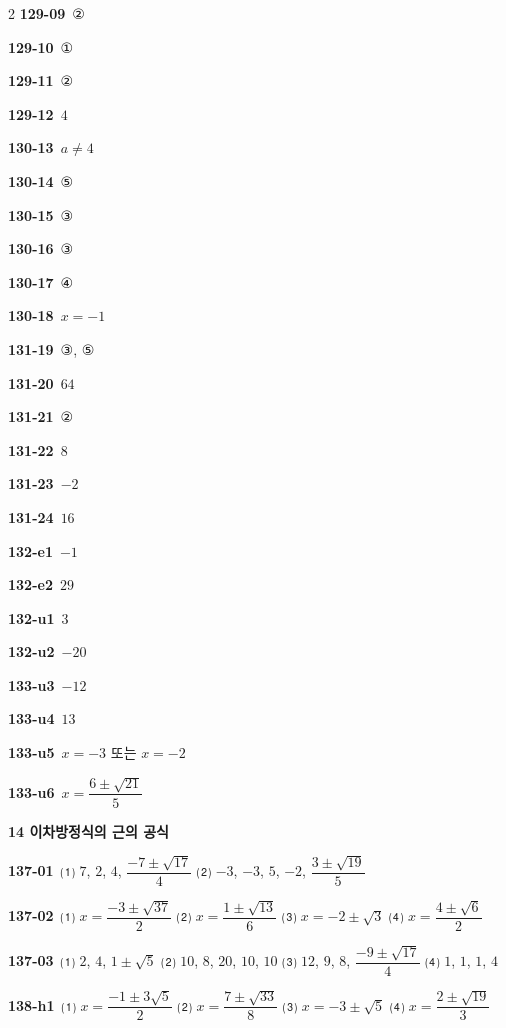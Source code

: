 \documentclass[10pt,a4paper]{article}
\begin{document}
\begin{multicols}{2}
\noindent\textbf{129-09}\ ②\par
\noindent\textbf{129-10}\ ①\par
\noindent\textbf{129-11}\ ②\par
\noindent\textbf{129-12}\ $4$\par
\noindent\textbf{130-13}\ $a\ne4$\par
\noindent\textbf{130-14}\ ⑤\par
\noindent\textbf{130-15}\ ③\par
\noindent\textbf{130-16}\ ③\par
\noindent\textbf{130-17}\ ④\par
\noindent\textbf{130-18}\ $x=-1$\par
\noindent\textbf{131-19}\ ③, ⑤\par
\noindent\textbf{131-20}\ $64$\par
\noindent\textbf{131-21}\ ②\par
\noindent\textbf{131-22}\ $8$\par
\noindent\textbf{131-23}\ $-2$\par
\noindent\textbf{131-24}\ $16$\par
\noindent\textbf{132-e1}\ $-1$\par
\noindent\textbf{132-e2}\ $29$\par
\noindent\textbf{132-u1}\ $3$\par
\noindent\textbf{132-u2}\ $-20$\par
\noindent\textbf{133-u3}\ $-12$\par
\noindent\textbf{133-u4}\ $13$\par
\noindent\textbf{133-u5}\ $x=-3$ 또는 $x=-2$\par
\noindent\textbf{133-u6}\ $x=\dfrac{6\pm\sqrt{21}}{5}$\par
\noindent\textbf{14 이차방정식의 근의 공식}\par\smallskip
\noindent\textbf{137-01}\ ⑴ $7$, $2$, $4$, $\dfrac{-7\pm\sqrt{17}}{4}$ ⑵ $-3$, $-3$, $5$, $-2$, $\dfrac{3\pm\sqrt{19}}{5}$\par
\noindent\textbf{137-02}\ ⑴ $x=\dfrac{-3\pm\sqrt{37}}{2}$ ⑵ $x=\dfrac{1\pm\sqrt{13}}{6}$ ⑶ $x=-2\pm\sqrt{3}$ ⑷ $x=\dfrac{4\pm\sqrt{6}}{2}$\par
\noindent\textbf{137-03}\ ⑴ $2$, $4$, $1\pm\sqrt{5}$ ⑵ $10$, $8$, $20$, $10$, $10$ ⑶ $12$, $9$, $8$, $\dfrac{-9\pm\sqrt{17}}{4}$ ⑷ $1$, $1$, $1$, $4$\par
\noindent\textbf{138-h1}\ ⑴ $x=\dfrac{-1\pm3\sqrt{5}}{2}$ ⑵ $x=\dfrac{7\pm\sqrt{33}}{8}$ ⑶ $x=-3\pm\sqrt{5}$ ⑷ $x=\dfrac{2\pm\sqrt{19}}{3}$\par

\end{multicols}
\end{document}
